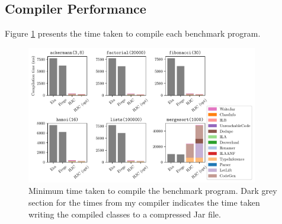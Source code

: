 \documentclass[dissertation.tex]{subfiles}
\begin{document}
{{        %


    }
    \subsection{Compiler Performance}
    {

        Figure \ref{fig:compiler-perf} presents the time taken to compile each benchmark program. 
        
        \begin{figure}[h]
            \centering
            \captionsetup{width=0.8\textwidth}
            \includegraphics[width=0.9\textwidth]{graphs/compiler_perf.pdf}
            \caption{Minimum time taken to compile the benchmark program. Dark grey section for the times from my compiler indicates the time taken writing the compiled classes to a compressed Jar file.}
            \label{fig:compiler-perf}
        \end{figure}

    }

}
\end{document}
